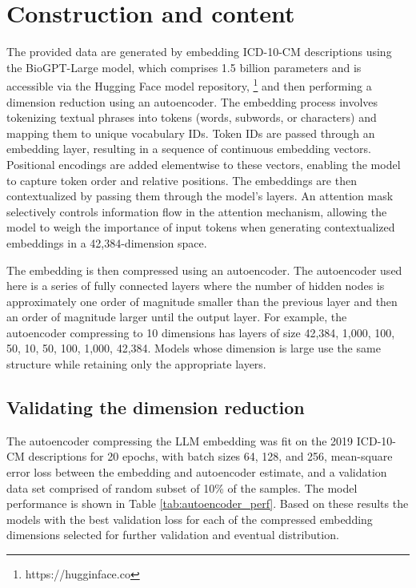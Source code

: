 \documentclass{bmcart}
\begin{document}
\section*{Construction and content}

The provided data are generated by embedding ICD-10-CM descriptions using the 
BioGPT-Large model, which comprises 1.5 billion parameters and is accessible 
via the Hugging Face model repository, \footnote{https://hugginface.co} and
then performing a dimension reduction using an autoencoder. 
The embedding process involves tokenizing 
textual phrases into tokens (words, subwords, or characters) and mapping them 
to unique vocabulary IDs. Token IDs are passed through an embedding layer, 
resulting in a sequence of continuous embedding vectors. Positional encodings 
are added elementwise to these vectors, enabling the model to capture token 
order and relative positions. The embeddings are then contextualized by 
passing them through the model's layers. An attention mask selectively 
controls information flow in the attention mechanism, allowing the model to 
weigh the importance of input tokens when generating contextualized embeddings 
in a 42,384-dimension space.

The embedding is then compressed using an autoencoder. The autoencoder used
here is 
a series of fully connected layers where the number of hidden nodes is 
approximately one order of magnitude smaller than the previous layer and then 
an order of magnitude larger until the output layer.  For example, the 
autoencoder compressing to 10 dimensions has layers of size 42,384, 1,000,
100, 50, 10, 50, 100, 1,000, 42,384. Models whose dimension is large use 
the same structure while retaining only the appropriate layers.

\subsection*{Validating the dimension reduction}

The autoencoder compressing the LLM embedding was fit on the 2019 ICD-10-CM 
descriptions for 20 epochs, with batch sizes 64, 128, and 256, mean-square 
error loss between the embedding and autoencoder estimate, and a validation 
data set comprised of random subset of 10\% of the samples. The model 
performance is shown in Table \ref{tab:autoencoder_perf}.  
Based on these results the models with the best 
validation loss for each of the compressed embedding dimensions selected 
for further validation and eventual distribution.
\end{document}

